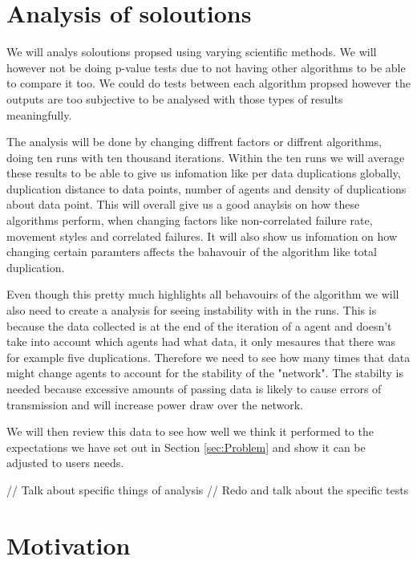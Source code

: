 \documentclass{UoYCSproject}
\begin{document}
\section{Analysis of soloutions}
\label{sec:Analysis of soloutions}

We will analys soloutions propsed using varying scientific methods.
We will however not be doing p-value tests due to not having other algorithms to be able to compare it too.
We could do tests between each algorithm propsed however the outputs are too subjective to be analysed with those types of results meaningfully.

The analysis will be done by changing diffrent factors or diffrent algorithms, doing ten runs with ten thousand iterations.
Within the ten runs we will average these results to be able to give us infomation like per data duplications globally, duplication distance to data points, number of agents and density of duplications about data point.
This will overall give us a good anaylsis on how these algorithms perform, when changing factors like non-correlated failure rate, movement styles and correlated failures.
It will also show us infomation on how changing certain paramters affects the bahavouir of the algorithm like total duplication.

Even though this pretty much highlights all behavouirs of the algorithm we will also need to create a analysis for seeing instability with in the runs.
This is because the data collected is at the end of the iteration of a agent and doesn't take into account which agents had what data, it only mesaures that there was for example five duplications.
Therefore we need to see how many times that data might change agents to account for the stability of the "network".
The stabilty is needed because excessive amounts of passing data is likely to cause errors of transmission and will increase power draw over the network.

We will then review this data to see how well we think it performed to the expectations we have set out in Section \ref{sec:Problem} and show it can be adjusted to users needs.

// Talk about specific things of analysis
// Redo and talk about the specific tests




\section{Motivation}
\label{sec:Motivation}
\end{document}
